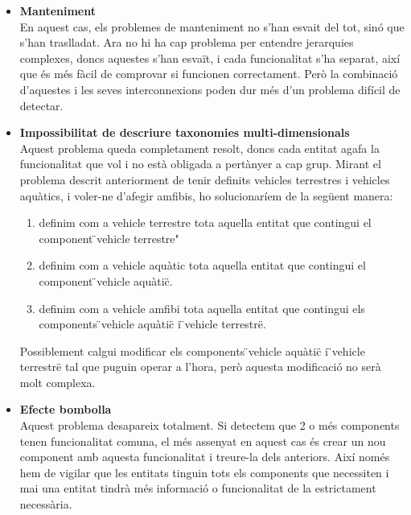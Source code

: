 \begin{itemize}
  \item {\bf Manteniment} \hfill \\
    En aquest cas, els problemes de manteniment no s'han esvait del tot, sinó que s'han traslladat. Ara no hi ha cap problema per entendre jerarquies complexes, doncs aquestes s'han esvaït, i cada funcionalitat s'ha separat, així que és més fàcil de comprovar si funcionen correctament. Però la combinació d'aquestes i les seves interconnexions poden dur més d'un problema difícil de detectar.
    
  \item {\bf Impossibilitat de descriure taxonomies multi-dimensionals} \hfill \\
    Aquest problema queda completament resolt, doncs cada entitat agafa la funcionalitat que vol i no està obligada a pertànyer a cap grup. Mirant el problema descrit anteriorment de tenir definits vehicles terrestres i vehicles aquàtics, i voler-ne d'afegir amfibis, ho solucionaríem de la següent manera:
    \begin{enumerate}
      \item definim com a vehicle terrestre tota aquella entitat que contingui el component \"{}vehicle terrestre"
      \item definim com a vehicle aquàtic tota aquella entitat que contingui el component \"{}vehicle aquàtic\"{}.
      \item definim com a vehicle amfibi tota aquella entitat que contingui els components \"{}vehicle aquàtic\"{} i  \"{}vehicle terrestre\"{}.
    \end{enumerate}
    
    Possiblement calgui modificar els components \"{}vehicle aquàtic\"{} i  \"{}vehicle terrestre\"{} tal que puguin operar a l'hora, però aquesta modificació no serà molt complexa.
    
  \item {\bf Efecte bombolla} \hfill \\
    Aquest problema desapareix totalment. Si detectem que 2 o més components tenen funcionalitat comuna, el més assenyat en aquest cas és crear un nou component amb aquesta funcionalitat i treure-la dels anteriors. Així només hem de vigilar que les entitats tinguin tots els components que necessiten i mai una entitat tindrà més informació o funcionalitat de la estrictament necessària.
    
\end{itemize}

